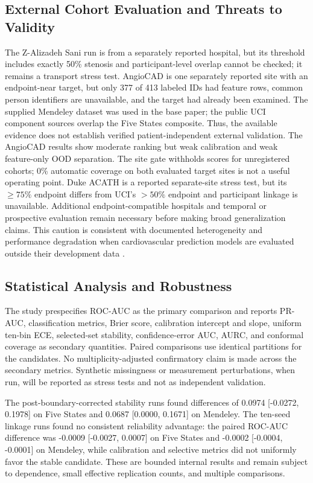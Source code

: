 \documentclass[journal]{IEEEtran}
\begin{document}
\subsection{External Cohort Evaluation and Threats to Validity}
The Z-Alizadeh Sani run is from a separately reported hospital, but
its threshold includes exactly 50\% stenosis and participant-level overlap
cannot be checked; it remains a transport stress test. AngioCAD is one
separately reported site with an endpoint-near target, but only 377 of 413
labeled IDs had feature rows, common person identifiers are unavailable, and
the target had already been examined. The supplied Mendeley dataset was used
in the base paper; the public UCI component sources overlap the Five States
composite. Thus, the available evidence does not establish verified
patient-independent external validation. The AngioCAD results show moderate
ranking but weak calibration and weak feature-only OOD separation. The site
gate withholds scores for unregistered cohorts; 0\% automatic coverage on both
evaluated target sites is not a useful operating point. Duke ACATH is a
reported separate-site stress test, but its \(\geq75\%\) endpoint differs from
UCI's \(>50\%\) endpoint and participant linkage is unavailable. Additional
endpoint-compatible hospitals and temporal or prospective evaluation remain
necessary before making broad generalization claims. This caution is
consistent with documented
heterogeneity and performance degradation when cardiovascular prediction
models are evaluated outside their development data
\cite{wessler2021external}.

\subsection{Statistical Analysis and Robustness}
The study prespecifies ROC-AUC as the primary comparison and reports PR-AUC,
classification metrics, Brier score, calibration intercept and slope, uniform
ten-bin ECE, selected-set stability, confidence-error AUC, AURC, and conformal
coverage as secondary quantities. Paired comparisons use identical partitions
for the candidates. No multiplicity-adjusted confirmatory claim is made across
the secondary metrics. Synthetic missingness or measurement perturbations,
when run, will be reported as stress tests and not as independent validation.

The post-boundary-corrected stability runs found differences of 0.0974
[-0.0272, 0.1978] on Five States and 0.0687 [0.0000, 0.1671] on Mendeley.
The ten-seed linkage runs found no consistent reliability advantage: the paired
ROC-AUC difference was -0.0009 [-0.0027, 0.0007] on Five States and -0.0002
[-0.0004, -0.0001] on Mendeley, while calibration and selective metrics did
not uniformly favor the stable candidate. These are bounded internal results
and remain subject to dependence, small effective replication counts, and
multiple comparisons.
\end{document}
